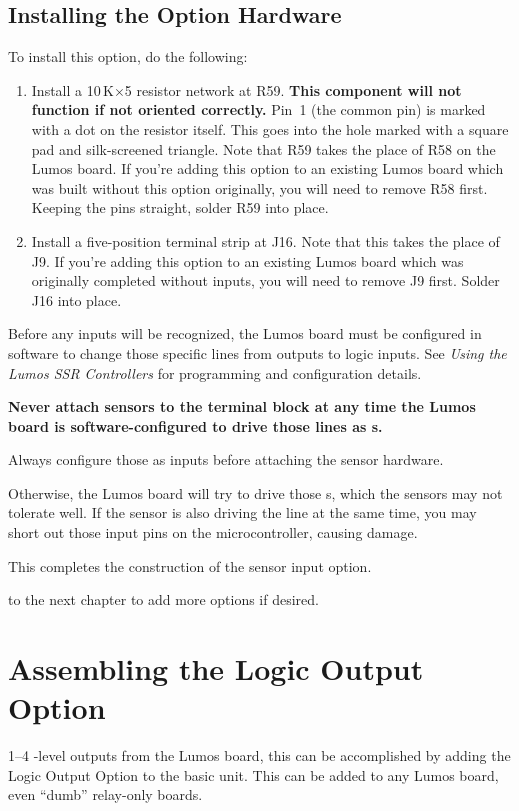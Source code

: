 \documentclass[letterpaper,twoside,onecolumn,openright,final]{memoir}
\begin{document}


\section{Installing the Option Hardware}

To install this option, do the following:
\begin{enumerate}
\item	Install a 10\,K$\times$5 resistor network at R59.  {\bfseries This component will not
	function if not oriented correctly.} Pin~1 (the common pin) is marked with a dot on the 
	resistor itself.  This goes into the hole marked with a square pad and silk-screened 
	triangle.  Note that R59 takes the place of R58 on the Lumos board.  If you're adding this
	option to an existing Lumos board which was built without this option originally, you 
	will need to remove R58 first.  Keeping the pins straight, solder R59 into place.
\item	Install a five-position terminal strip at J16.  Note that this takes the place of J9.
	If you're adding this option to an existing Lumos board which was originally completed
	without inputs, you will need to remove J9 first.  Solder J16 into place.
\end{enumerate}

\begin{description}
\item[\HandRight\ Note:] Before any inputs will be recognized, the Lumos board must be configured
in software to change those specific lines from  outputs to logic inputs.  See
\emph{Using the Lumos SSR Controllers} for programming and configuration details.
{\bfseries Never attach sensors to the terminal block at any time the Lumos board is software-configured
to drive those lines as s.  
\item[\HandRight\ Note:] Always configure those as inputs before attaching the
sensor hardware.} Otherwise, the Lumos board will try to drive those s, which the
sensors may not tolerate well. If the sensor is also driving the line at the same time, you may
short out those input pins on the microcontroller, causing damage.
\end{description}

This completes the construction of the sensor input option.

\bigskip{} to the next chapter to add more options if desired.

\chapter{Assembling the Logic Output Option}\label{ch:logic-out}
 1--4 -level outputs from the Lumos board,
this can be accomplished by adding the Logic Output Option to the basic unit.  This can be
added to any Lumos board, even ``dumb'' relay-only boards.  
\end{document}
